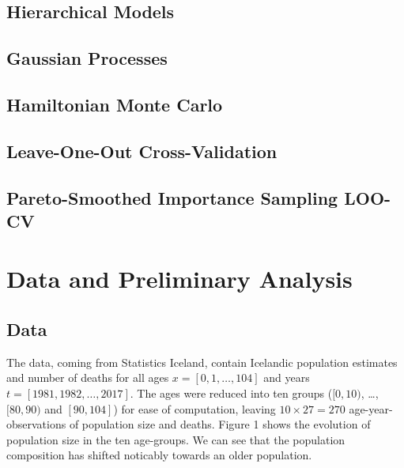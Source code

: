 \documentclass[
]{book}
\begin{document}
\hypertarget{hierarchical-models}{%
\section{Hierarchical Models}\label{hierarchical-models}}

\hypertarget{gaussian-processes}{%
\section{Gaussian Processes}\label{gaussian-processes}}

\hypertarget{hamiltonian-monte-carlo}{%
\section{Hamiltonian Monte Carlo}\label{hamiltonian-monte-carlo}}

\hypertarget{leave-one-out-cross-validation}{%
\section{Leave-One-Out Cross-Validation}\label{leave-one-out-cross-validation}}

\hypertarget{pareto-smoothed-importance-sampling-loo-cv}{%
\section{Pareto-Smoothed Importance Sampling LOO-CV}\label{pareto-smoothed-importance-sampling-loo-cv}}

\hypertarget{data-and-preliminary-analysis}{%
\chapter{Data and Preliminary Analysis}\label{data-and-preliminary-analysis}}

\hypertarget{data}{%
\section{Data}\label{data}}

The data, coming from Statistics Iceland, contain Icelandic population estimates and number of deaths for all ages \(x = [0, 1, \dots, 104]\) and years \(t = [1981, 1982, \dots, 2017]\). The ages were reduced into ten groups (\([0, 10)\), \ldots, \([80, 90)\) and \([90, 104]\)) for ease of computation, leaving \(10 \times 27 = 270\) age-year-observations of population size and deaths. Figure 1 shows the evolution of population size in the ten age-groups. We can see that the population composition has shifted noticably towards an older population.
\end{document}
